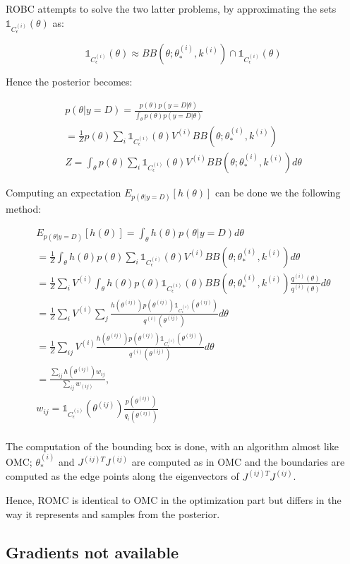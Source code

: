 \documentclass{article}
\begin{document}
ROBC attempts to solve the two latter problems, by approximating the sets $\mathbb{1}_{C_\epsilon^{(i)}}(\theta)$ as:

$$ \mathbb{1}_{C_\epsilon^{(i)}}(\theta) \approx BB(\theta; \theta_*^{(i)}, k^{(i)}) \cap \mathbb{1}_{C_\epsilon^{(i)}}(\theta)$$

Hence the posterior becomes:

\begin{gather} \label{eq:ROBC_posterior}
  p(\theta|y=D) = \frac{p(\theta)p(y=D|\theta)}{\int_\theta p(\theta)p(y=D|\theta)} \\
  = \frac{1}{Z}p(\theta) \sum_i \mathbb{1}_{C_\epsilon^{(i)}}(\theta)V^{(i)}BB(\theta; \theta_*^{(i)}, k^{(i)}) \\
  Z = \int_\theta p(\theta) \sum_i \mathbb{1}_{C_\epsilon^{(i)}}(\theta)V^{(i)}BB(\theta; \theta_*^{(i)}, k^{(i)}) d\theta
\end{gather}


Computing an expectation $E_{p(\theta|y=D)}[h(\theta)]$ can be done we the following method:

\begin{gather} \label{eq:ROMC_expectation}
  E_{p(\theta|y=D)}[h(\theta)] = \int_\theta h(\theta)p(\theta|y=D)d\theta \\
  = \frac{1}{Z} \int_\theta h(\theta)p(\theta) \sum_i \mathbb{1}_{C_\epsilon^{(i)}}(\theta)V^{(i)}BB(\theta; \theta_*^{(i)}, k^{(i)}) d\theta \\
  = \frac{1}{Z} \sum_i V^{(i)} \int_\theta h(\theta)p(\theta)  \mathbb{1}_{C_\epsilon^{(i)}}(\theta)BB(\theta; \theta_*^{(i)}, k^{(i)}) \frac{q^{(i)}(\theta)}{q^{(i)}(\theta)}d\theta \\  
  = \frac{1}{Z} \sum_i V^{(i)} \sum_j \frac{h(\theta^{(ij)})p(\theta^{(ij)}) \mathbb{1}_{C_\epsilon^{(i)}}(\theta^{(ij)})}{q^{(i)}(\theta^{(ij)})}d\theta \\
  = \frac{1}{Z} \sum_{ij} V^{(i)} \frac{h(\theta^{(ij)})p(\theta^{(ij)}) \mathbb{1}_{C_\epsilon^{(i)}}(\theta^{(ij)})}{q^{(i)}(\theta^{(ij)})}d\theta \\
  = \frac{ \sum_{ij} h(\theta^{(ij)})w_{ij}}{ \sum_{ij}w_{(ij)}}, \\
  w_{ij} = \mathbb{1}_{C_\epsilon^{(i)}}(\theta^{(ij)}) \frac{p(\theta^{(ij)})}{q_{i}(\theta^{(ij)})} \\
\end{gather}


The computation of the bounding box is done, with an algorithm almost like OMC; $\theta_*^{(i)}$ and $J^{(ij)T}J^{(ij)}$ are computed as in OMC and the boundaries are computed as the edge points along the eigenvectors of $J^{(ij)T}J^{(ij)}$.

Hence, ROMC is identical to OMC in the optimization part but differs in the way it represents and samples from the posterior.

\subsection{Gradients not available}
\end{document}
